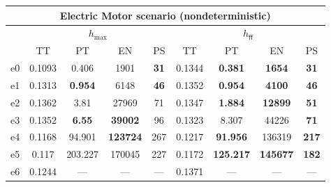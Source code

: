 \documentclass[landscape]{article}%
\begin{document}
%
\normalsize%
\begin{tabular}{||c||c|c|c|c|c|c|c|c||}%
\multicolumn{9}{c}{\textbf{Electric Motor scenario (nondeterministic)}}\\%
\hline%
&\multicolumn{4}{||c||}{$h_{\max}$}&\multicolumn{4}{||c||}{$h_{\mathsf{ff}}$}\\%
\hline%
&\small{TT}&\small{PT}&\small{EN}&\small{PS}&\small{TT}&\small{PT}&\small{EN}&\small{PS}\\%
\hline%
\hline%
e0&\small{0.1093}&\small{0.406}&\small{1901}&\small{\textbf{31}}&\small{0.1344}&\small{\textbf{0.381}}&\small{\textbf{1654}}&\small{\textbf{31}}\\%
\hline%
e1&\small{0.1313}&\small{\textbf{0.954}}&\small{6148}&\small{\textbf{46}}&\small{0.1352}&\small{\textbf{0.954}}&\small{\textbf{4100}}&\small{\textbf{46}}\\%
\hline%
e2&\small{0.1362}&\small{3.81}&\small{27969}&\small{71}&\small{0.1347}&\small{\textbf{1.884}}&\small{\textbf{12899}}&\small{\textbf{51}}\\%
\hline%
e3&\small{0.1352}&\small{\textbf{6.55}}&\small{\textbf{39002}}&\small{96}&\small{0.1323}&\small{8.307}&\small{44226}&\small{\textbf{71}}\\%
\hline%
e4&\small{0.1168}&\small{94.901}&\small{\textbf{123724}}&\small{267}&\small{0.1217}&\small{\textbf{91.956}}&\small{136319}&\small{\textbf{217}}\\%
\hline%
e5&\small{0.117}&\small{203.227}&\small{170045}&\small{227}&\small{0.1172}&\small{\textbf{125.217}}&\small{\textbf{145677}}&\small{\textbf{182}}\\%
\hline%
e6&\small{0.1244}&\small{---}&\small{---}&\small{---}&\small{0.1371}&\small{---}&\small{---}&\small{---}\\%
\hline%
\end{tabular}%
\end{document}
